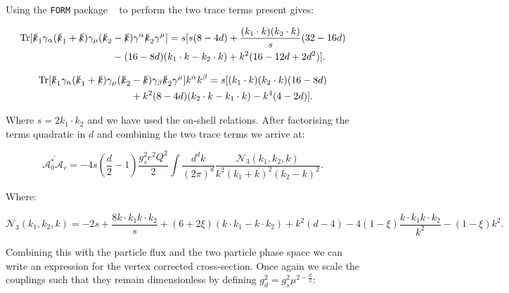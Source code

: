 	Using the \texttt{FORM} package ~\cite{form} to perform the two trace terms present gives:

	\begin{equation}
	\begin{split}
	\operatorname{Tr}[\slashed k_1 \gamma_\alpha(\slashed k_1 + \slashed k)\gamma_\mu(\slashed k_2 &-
	\slashed k)\gamma^\alpha\slashed k_2\gamma^\mu] = s[s(8-4d) + \frac{(k_1\cdot k)(k_2\cdot k)}{s}(32-16d) \\
	&- (16-8d)(k_1\cdot k - k_2\cdot k) + k^2(16-12d+2d^2)].
	\end{split}
	\end{equation}

	\begin{equation}
	\begin{split}
	\operatorname{Tr}[\slashed k_1 \gamma_\alpha(\slashed k_1 + \slashed k)\gamma_\mu(\slashed k_2 &- \slashed k)\gamma_\beta
	\slashed k_2\gamma^\mu]k^\alpha k^\beta = s[(k_1\cdot k)(k_2\cdot k)(16 - 8d) \\
	&+ k^2(8 - 4d)(k_2\cdot k - k_1\cdot k) - k^4(4 - 2d)].
	\end{split}
	\end{equation}

	Where $s = 2k_1\cdot k_2$ and we have used the on-shell relations.  After factorising the terms
	quadratic in $d$ and combining the two trace terms we arrive at:

	\begin{equation}
	\overline{\mathcal{A}_0^*\mathcal{A}_v} = -4s\left(\frac{d}{2}-1\right)\frac{g_s^2e^2Q^2}{2}
	\int\frac{d^{d}k}{(2\pi)^{d}}\frac{\mathcal{N}_3(k_1, k_2, k)}{k^2(k_1+k)^2(k_2-k)^2}.
	\end{equation}

	Where:

	\begin{equation}
	\mathcal{N}_3(k_1, k_2, k) = -2s + \frac{8k\cdot k_1k\cdot k_2}{s} + (6+2\xi)(k\cdot k_1 -
	k\cdot k_2) + k^2(d-4) - 4(1-\xi)\frac{k\cdot k_1 k\cdot k_2}{k^2} - (1-\xi)k^2.
	\end{equation}

	Combining this with the particle flux and the two particle phase space we can write an expression
	for the vertex corrected cross-section.  Once again we scale the couplings such that they remain
	dimensionless by defining $g_d^2=g_s^2\mu^{2-\frac{d}{2}}$:


